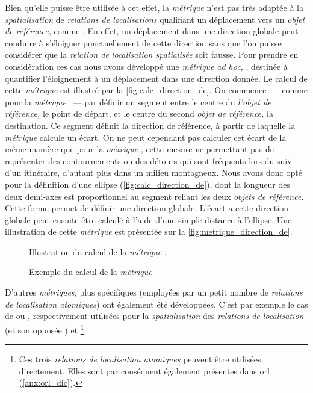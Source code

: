 Bien qu'elle puisse être utilisée à cet effet, la \emph{métrique}
 n'est pas très adaptée à la
\emph{spatialisation} de \emph{relations de localisations} qualifiant
un déplacement vers un \emph{objet de référence,} comme
. En effet, un déplacement dans une
direction globale peut conduire à s'éloigner ponctuellement de cette
direction sans que l'on puisse considérer que la \emph{relation de
  localisation spatialisée} soit fausse. Pour prendre en considération
ces cas nous avons développé une \emph{métrique} \emph{ad hoc,}
, destinée à quantifier l'éloignement à un
déplacement dans une direction donnée. Le calcul de cette
\emph{métrique} est illustré par la
\autoref{fig:calc_direction_de}. On commence ---~comme pour la
\emph{métrique} ~--- par définir un segment
entre le centre du \emph{l'objet de référence,} le point de départ, et
le centre du second \emph{objet de référence,} la destination. Ce
segment définit la direction de référence, à partir de laquelle la
\emph{métrique} calcule un écart. On ne peut cependant pas calculer
cet écart de la même manière que pour la \emph{métrique}
, cette mesure ne permettant pas de représenter
des contournements ou des détours qui sont fréquents lors du suivi
d'un itinéraire, d'autant plus dans un milieu montagneux. Nous avons
donc opté pour la définition d'une ellipse
(\autoref{fig:calc_direction_de}), dont la longueur des deux demi-axes
est proportionnel au segment reliant les deux \emph{objets de
  référence.}  Cette forme permet de définir une direction
globale. L'écart a cette direction globale peut ensuite être calculé à
l'aide d'une simple distance à l'ellipse. Une illustration de cette
\emph{métrique} est présentée sur la
\autoref{fig:metrique_direction_de}.

\begin{figure}
  \centering
  
  \caption{Illustration du calcul de la \emph{métrique}
    \protect{}.}
  \label{fig:calc_direction_de}
\end{figure}

\begin{figure}
  \centering
  
  \caption{Exemple du calcul de la \emph{métrique}
    \protect{}}
  \label{fig:metrique_direction_de}
\end{figure}

D'autres \emph{métriques,} plus spécifiques (\ie employées par un
petit nombre de \emph{relations de localisation atomiques}) ont
également été développées. C'est par exemple le cas de
 ou , respectivement
utilisées pour la \emph{spatialisation} des \emph{relations de
  localisation}  (et son opposée
) et 
\footnote{Ces trois \emph{relations de localisation atomiques} peuvent
  être utilisées directement. Elles sont par conséquent également
  présentes dans \ac{orl} (\autoref{anx:orl_dic}).}.

